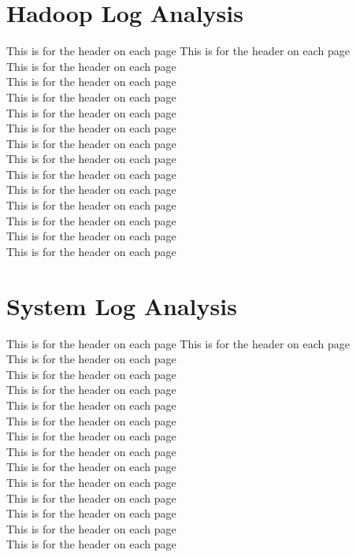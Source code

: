 \section{Hadoop Log Analysis}
This is for the header on each page
This is for the header on each page\\
This is for the header on each page\\
This is for the header on each page\\
This is for the header on each page\\
This is for the header on each page\\
This is for the header on each page\\
This is for the header on each page\\
This is for the header on each page\\
This is for the header on each page\\
This is for the header on each page\\
This is for the header on each page\\
This is for the header on each page\\
This is for the header on each page\\
This is for the header on each page

\section{System Log Analysis}
This is for the header on each page
This is for the header on each page\\
This is for the header on each page\\
This is for the header on each page\\
This is for the header on each page\\
This is for the header on each page\\
This is for the header on each page\\
This is for the header on each page\\
This is for the header on each page\\
This is for the header on each page\\
This is for the header on each page\\
This is for the header on each page\\
This is for the header on each page\\
This is for the header on each page\\
This is for the header on each page

